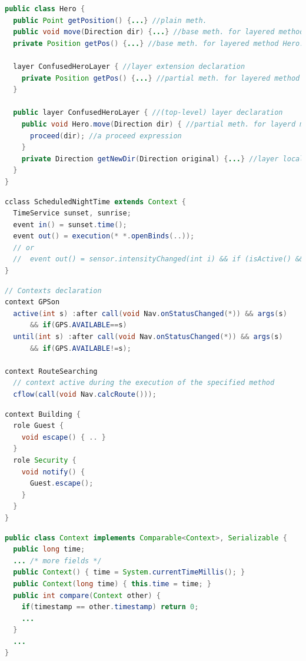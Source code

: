 \documentclass[a4paper]{article}
\begin{document}
\begin{lstlisting}[float, language=Java, caption=JCop layer example, label={listing:jcoplayer}]
public class Hero {
  public Point getPosition() {...} //plain meth.
  public void move(Direction dir) {...} //base meth. for layered method Hero.move
  private Position getPos() {...} //base meth. for layered method Hero.getPos
  
  layer ConfusedHeroLayer { //layer extension declaration
    private Position getPos() {...} //partial meth. for layered method Hero.getPos
  }

  public layer ConfusedHeroLayer { //(top-level) layer declaration
    public void Hero.move(Direction dir) { //partial meth. for layerd meth. Hero.move
      proceed(dir); //a proceed expression
    }
    private Direction getNewDir(Direction original) {...} //layer local method
  }
}
\end{lstlisting}

\begin{lstlisting}[float, language=Java, caption=ECaesarJ context declaration, label={listing:ecaesarjcontext}]
cclass ScheduledNightTime extends Context {
  TimeService sunset, sunrise;
  event in() = sunset.time();
  event out() = execution(* *.openBinds(..));
  // or
  //  event out() = sensor.intensityChanged(int i) && if (isActive() && i > threshold);
}
\end{lstlisting}

\begin{lstlisting}[float, language=Java, caption=Javanese context declaration, label={listing:javanesecontext}]
// Contexts declaration
context GPSon
  active(int s) :after call(void Nav.onStatusChanged(*)) && args(s)
      && if(GPS.AVAILABLE==s)
  until(int s) :after call(void Nav.onStatusChanged(*)) && args(s)
      && if(GPS.AVAILABLE!=s);
      
context RouteSearching
  // context active during the execution of the specified method
  cflow(call(void Nav.calcRoute()));
\end{lstlisting}

\begin{lstlisting}[float, language=Java, caption=NextEJ context declaration, label={listing:nextejcontext}]
context Building {
  role Guest {
    void escape() { .. }
  }
  role Security {
    void notify() {
      Guest.escape();
    }
  }
}
\end{lstlisting}

\begin{lstlisting}[float, language=Java, caption=EventJava context declaration, label={listing:eventjavacontext}]
public class Context implements Comparable<Context>, Serializable {
  public long time;
  ... /* more fields */
  public Context() { time = System.currentTimeMillis(); }
  public Context(long time) { this.time = time; }
  public int compare(Context other) {
    if(timestamp == other.timestamp) return 0;
    ...
  }
  ...
}
\end{lstlisting}
\end{document}
